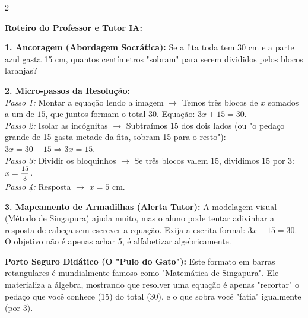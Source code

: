 \begin{multicols*}{2}
\ifgabarito
    \begin{tcolorbox}[colback=CorTitUm!5, colframe=CorTitUm, boxrule=1pt, arc=4pt, left=6pt, right=6pt, top=6pt, bottom=6pt]
    \small\textbf{\textcolor{CorTitUm}{Roteiro do Professor e Tutor IA:}}\par\vspace{0.1cm}
    \color{CinzaEscuro}
    \textbf{1. Ancoragem (Abordagem Socrática):} Se a fita toda tem 30 cm e a parte azul gasta 15 cm, quantos centímetros "sobram" para serem divididos pelos blocos laranjas?\par\vspace{0.1cm}
    
    \textbf{2. Micro-passos da Resolução:}\\
    \textit{Passo 1:} Montar a equação lendo a imagem $\rightarrow$ Temos três blocos de $x$ somados a um de $15$, que juntos formam o total $30$. Equação: $ 3x + 15 = 30 $.\\
    \textit{Passo 2:} Isolar as incógnitas $\rightarrow$ Subtraímos 15 dos dois lados (ou "o pedaço grande de 15 gasta metade da fita, sobram 15 para o resto"): $ 3x = 30 - 15 \Rightarrow 3x = 15 $.\\
    \textit{Passo 3:} Dividir os bloquinhos $\rightarrow$ Se três blocos valem 15, dividimos 15 por 3: $ x = \mfrac{15}{3} $.\\
    \textit{Passo 4:} Resposta $\rightarrow$ $ x = 5 \text{ cm} $.\par\vspace{0.1cm}
    
    \textbf{3. Mapeamento de Armadilhas (Alerta Tutor):} A modelagem visual (Método de Singapura) ajuda muito, mas o aluno pode tentar adivinhar a resposta de cabeça sem escrever a equação. Exija a escrita formal: $3x + 15 = 30$. O objetivo não é apenas achar 5, é alfabetizar algebricamente.
    \end{tcolorbox}
    \vspace{0.15cm}
    
    \begin{boxexplicacao}
    \textbf{Porto Seguro Didático (O "Pulo do Gato"):} Este formato em barras retangulares é mundialmente famoso como "Matemática de Singapura". Ele materializa a álgebra, mostrando que resolver uma equação é apenas "recortar" o pedaço que você conhece (15) do total (30), e o que sobra você "fatia" igualmente (por 3).
    \end{boxexplicacao}
\fi


\end{multicols*}
